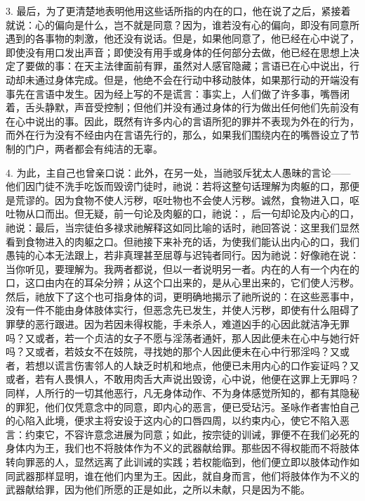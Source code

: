 3. 最后，为了更清楚地表明他用这些话所指的内在的口，他在说了之后，紧接着就说：心的偏向是什么，岂不就是同意？因为，谁若没有心的偏向，即没有同意所遇到的各事物的刺激，他还没有说话。但是，如果他同意了，他已经在心中说了，即使没有用口发出声音；即使没有用手或身体的任何部分去做，他已经在思想上决定了要做的事：在天主法律面前有罪，虽然对人感官隐藏；言语已在心中说出，行动却未通过身体完成。但是，他绝不会在行动中移动肢体，如果那行动的开端没有事先在言语中发生。因为经上写的不是谎言：事实上，人们做了许多事，嘴唇闭着，舌头静默，声音受控制；但他们并没有通过身体的行为做出任何他们先前没有在心中说出的事。因此，既然有许多内心的言语所犯的罪并不表现为外在的行为，而外在行为没有不经由内在言语先行的，那么，如果我们围绕内在的嘴唇设立了节制的门户，两者都会有纯洁的无辜。\par

4. 为此，主自己也曾亲口说：此外，在另一处，当祂驳斥犹太人愚昧的言论——他们因门徒不洗手吃饭而毁谤门徒时，祂说：若将这整句话理解为肉躯的口，那便是荒谬的。因为食物不使人污秽，呕吐物也不会使人污秽。诚然，食物进入口，呕吐物从口而出。但无疑，前一句论及肉躯的口，祂说：，后一句却论及内心的口，祂说：最后，当宗徒伯多禄求祂解释这如同比喻的话时，祂回答说：这里我们显然看到食物进入的肉躯之口。但祂接下来补充的话，为使我们能认出内心的口，我们愚钝的心本无法跟上，若非真理甚至屈尊与迟钝者同行。因为祂说：好像祂在说：当你听见，要理解为。我两者都说，但以一者说明另一者。内在的人有一个内在的口，这口由内在的耳朵分辨；从这个口出来的，是从心里出来的，它们使人污秽。然后，祂放下了这个也可指身体的词，更明确地揭示了祂所说的：在这些恶事中，没有一件不能由身体肢体实行，但恶念先已发生，并使人污秽，即使有什么阻碍了罪孽的恶行跟进。因为若因未得权能，手未杀人，难道凶手的心因此就洁净无罪吗？又或者，若一个贞洁的女子不愿与淫荡者通奸，那人因此便未在心中与她行奸吗？又或者，若妓女不在妓院，寻找她的那个人因此便未在心中行邪淫吗？又或者，若想以谎言伤害邻人的人缺乏时机和地点，他便已未用内心的口作妄证吗？又或者，若有人畏惧人，不敢用肉舌大声说出毁谤，心中说，他便在这罪上无罪吗？同样，人所行的一切其他恶行，凡无身体动作、不为身体感觉所知的，都有其隐秘的罪犯，他们仅凭意念中的同意，即内心的恶言，便已受玷污。圣咏作者害怕自己的心陷入此境，便求主将安设于这内心的口唇四周，以约束内心，使它不陷入恶言：约束它，不容许意念进展为同意；如此，按宗徒的训诫，罪便不在我们必死的身体内为王，我们也不将肢体作为不义的武器献给罪。那些因不得权能而不将肢体转向罪恶的人，显然远离了此训诫的实践；若权能临到，他们便立即以肢体动作如同武器那样显明，谁在他们内里为王。因此，就自身而言，他们将肢体作为不义的武器献给罪，因为他们所愿的正是如此，之所以未献，只是因为不能。\par

